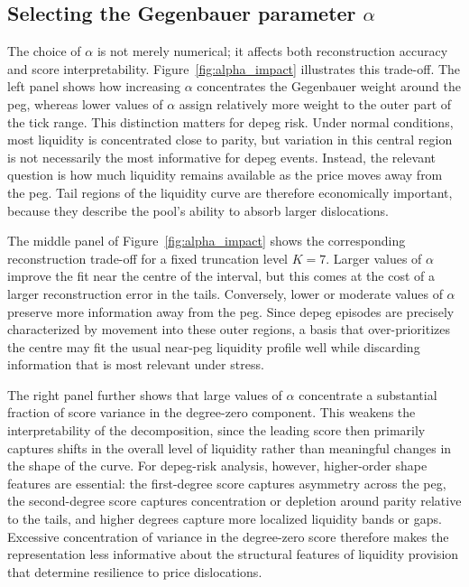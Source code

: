 \documentclass[a4paper,fleqn]{cas-sc}
\begin{document}
\subsection{Selecting the Gegenbauer parameter $\alpha$}

The choice of $\alpha$ is not merely numerical; it affects both reconstruction accuracy and score interpretability. Figure~\ref{fig:alpha_impact} illustrates this trade-off. The left panel shows how increasing $\alpha$ concentrates the Gegenbauer weight around the peg, whereas lower values of $\alpha$ assign relatively more weight to the outer part of the tick range. This distinction matters for depeg risk. Under normal conditions, most liquidity is concentrated close to parity, but variation in this central region is not necessarily the most informative for depeg events. Instead, the relevant question is how much liquidity remains available as the price moves away from the peg. Tail regions of the liquidity curve are therefore economically important, because they describe the pool's ability to absorb larger dislocations.

The middle panel of Figure~\ref{fig:alpha_impact} shows the corresponding reconstruction trade-off for a fixed truncation level $K=7$. Larger values of $\alpha$ improve the fit near the centre of the interval, but this comes at the cost of a larger reconstruction error in the tails. Conversely, lower or moderate values of $\alpha$ preserve more information away from the peg. Since depeg episodes are precisely characterized by movement into these outer regions, a basis that over-prioritizes the centre may fit the usual near-peg liquidity profile well while discarding information that is most relevant under stress.

The right panel further shows that large values of $\alpha$ concentrate a substantial fraction of score variance in the degree-zero component. This weakens the interpretability of the decomposition, since the leading score then primarily captures shifts in the overall level of liquidity rather than meaningful changes in the shape of the curve. For depeg-risk analysis, however, higher-order shape features are essential: the first-degree score captures asymmetry across the peg, the second-degree score captures concentration or depletion around parity relative to the tails, and higher degrees capture more localized liquidity bands or gaps. Excessive concentration of variance in the degree-zero score therefore makes the representation less informative about the structural features of liquidity provision that determine resilience to price dislocations.
\end{document}
